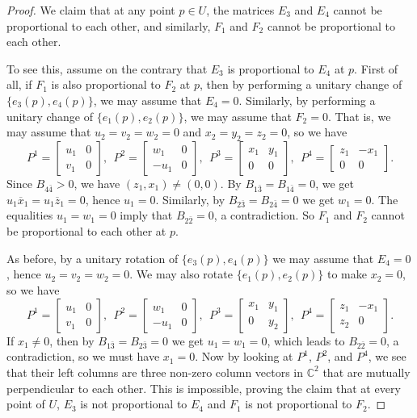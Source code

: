 \documentclass{amsart}
\begin{document}
\begin{proof}
\vspace{0.2cm}

We claim that at any point $p\in U$, the matrices $E_3$ and $E_4$ cannot be proportional to each other, and similarly, $F_1$ and $F_2$ cannot be proportional to each other.

To see this, assume on the contrary that $E_3$ is proportional to $E_4$ at $p$.  First of all, if $F_1$ is also proportional to $ F_2$ at $p$, then by performing a unitary change of $\{ e_3(p), e_4(p)\}$, we may assume that $E_4=0$. Similarly, by performing a unitary change of $\{ e_1(p), e_2(p)\}$, we may assume that $F_2=0$. That is, we may assume that $u_2=v_2=w_2=0$ and $x_2=y_2=z_2=0$, so we have
$$ P^1 = \left[ \begin{array}{cc} u_1 & 0 \\ v_1 & 0 \end{array} \right], \ \ P^2 = \left[ \begin{array}{cc} w_1 & 0 \\ -u_1 & 0 \end{array} \right],\ \  P^3 = \left[ \begin{array}{cc} x_1 & y_1 \\ 0 & 0 \end{array} \right], \ \ P^4 = \left[ \begin{array}{cc} z_1 & -x_1 \\ 0 & 0 \end{array} \right]. $$
Since $B_{4\bar{4}}>0$, we have $(z_1, x_1)\neq (0,0)$. By $B_{1\bar{3}}=B_{1\bar{4}}=0$, we get $u_1\overline{x}_1= u_1\overline{z}_1=0$, hence $u_1=0$. Similarly, by $B_{2\bar{3}}=B_{2\bar{4}}=0$ we get $w_1=0$. The equalities $u_1=w_1=0$ imply that $B_{2\bar{2}}=0$, a contradiction. So $F_1$ and $F_2$ cannot be proportional to each other at $p$.

As before, by a unitary rotation of $\{ e_3(p), e_4(p)\}$ we may assume that $E_4=0$, hence $u_2=v_2=w_2=0$. We may also rotate $\{ e_1(p), e_2(p)\}$ to make $x_2=0$, so we have
$$ P^1 = \left[ \begin{array}{cc} u_1 & 0 \\ v_1 & 0 \end{array} \right], \ \ P^2 = \left[ \begin{array}{cc} w_1 & 0 \\ -u_1 & 0 \end{array} \right],\ \  P^3 = \left[ \begin{array}{cc} x_1 & y_1 \\ 0 & y_2 \end{array} \right], \ \ P^4 = \left[ \begin{array}{cc} z_1 & -x_1 \\ z_2 & 0 \end{array} \right]. $$
If $x_1\neq 0$, then by $B_{1\bar{3}}=B_{2\bar{3}}=0$ we get $u_1=w_1=0$, which leads to $B_{2\bar{2}}=0$, a contradiction, so we must have $x_1=0$. Now by looking at $P^1$, $P^2$, and $P^4$, we see that their left columns are three non-zero column vectors in ${\mathbb C}^2$ that are mutually perpendicular to each other. This is impossible, proving the claim that at every point of $U$, $E_3$ is not proportional to $E_4$ and $F_1$ is not proportional to $ F_2$.


\end{proof}
\end{document}
